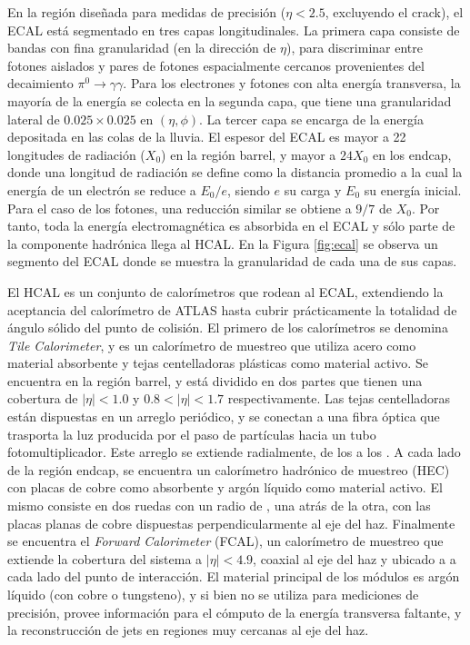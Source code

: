 En la región diseñada para medidas de precisión ($\eta < 2.5$, excluyendo el crack),
el ECAL está segmentado en tres capas longitudinales. La primera capa consiste de
bandas con fina granularidad (en la dirección de $\eta$), para discriminar entre fotones
aislados y pares de fotones espacialmente cercanos provenientes del decaimiento
$\pi^0\to\gamma\gamma$. Para los electrones y fotones con alta energía transversa, la mayoría
de la energía se colecta en la segunda capa, que tiene una granularidad lateral de
$0.025 \times 0.025$ en $(\eta, \phi)$. La tercer capa se encarga de la energía depositada en las
colas de la lluvia.
El espesor del ECAL es mayor a 22 longitudes de radiación ($X_0$) en la región
barrel, y mayor a $24X_0$ en los endcap, donde una longitud de radiación se define
como la distancia promedio a la cual la energía de un electrón se reduce a $E_0/e$, siendo $e$ su carga y $E_0$ su energía inicial. Para el caso de los fotones, una reducción similar se obtiene a
$9/7$ de $X_0$. Por tanto, toda la energía electromagnética es absorbida en el ECAL y
sólo parte de la componente hadrónica llega al HCAL. En la Figura \ref{fig:ecal} se observa un segmento del ECAL donde se muestra la granularidad de cada una de sus capas.



El HCAL es un conjunto de calorímetros que rodean al ECAL, extendiendo la aceptancia del calorímetro de ATLAS hasta cubrir prácticamente la totalidad de ángulo sólido del punto de colisión. El primero de los calorímetros se denomina \textit{Tile Calorimeter}, y es un calorímetro de muestreo que utiliza acero como material absorbente y tejas centelladoras plásticas como material activo. Se encuentra en la región barrel, y está dividido en dos partes que tienen una cobertura de $|\eta|<1.0$ y $0.8<|\eta|<1.7$ respectivamente. Las tejas centelladoras están dispuestas en un arreglo
periódico, y se conectan a una fibra óptica que trasporta la luz producida por el paso
de partículas hacia un tubo fotomultiplicador. Este arreglo se extiende radialmente, de los
 a los . 
A cada lado de la región endcap, se encuentra un calorímetro hadrónico de muestreo (HEC) con placas de cobre como absorbente y argón líquido como material activo. El mismo consiste en dos ruedas con un radio de , una atrás de la otra, con las placas planas de cobre dispuestas perpendicularmente al eje del haz. Finalmente se encuentra el \textit{Forward Calorimeter} (FCAL), un calorímetro de muestreo que extiende la cobertura del sistema a $|\eta|<4.9$, coaxial
al eje del haz y ubicado a  a cada lado del punto de interacción. El material
principal de los módulos es argón líquido (con cobre o tungsteno), y si bien no se
utiliza para mediciones de precisión, provee información para el cómputo de la energía transversa faltante, y la reconstrucción de jets en regiones muy cercanas al eje
del haz.



